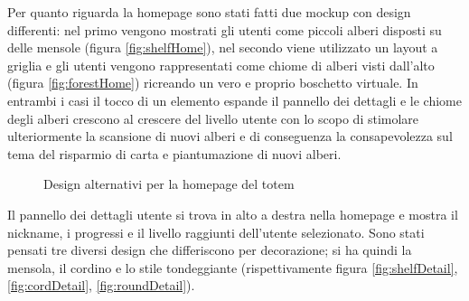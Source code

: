 Per quanto riguarda la homepage sono stati fatti due mockup con design differenti: nel primo vengono mostrati gli utenti come piccoli alberi disposti su delle mensole (figura \ref{fig:shelfHome}), nel secondo viene utilizzato un layout a griglia e gli utenti vengono rappresentati come chiome di alberi visti dall'alto (figura \ref{fig:forestHome}) ricreando un vero e proprio boschetto virtuale. In entrambi i casi il tocco di un elemento espande il pannello dei dettagli e le chiome degli alberi crescono al crescere del livello utente con lo scopo di stimolare ulteriormente la scansione di nuovi alberi e di conseguenza la consapevolezza sul tema del risparmio di carta e piantumazione di nuovi alberi.
\begin{figure}
    \centering
    \caption[Alternative di homepage nel totem]{Design alternativi per la homepage del totem}
    \label{fig:homepages}
\end{figure}

Il pannello dei dettagli utente si trova in alto a destra nella homepage e mostra il nickname, i progressi e il livello raggiunti dell'utente selezionato. Sono stati pensati tre diversi design  che differiscono per decorazione; si ha quindi la mensola, il cordino e lo stile tondeggiante (rispettivamente figura \ref{fig:shelfDetail}, \ref{fig:cordDetail}, \ref{fig:roundDetail}).

